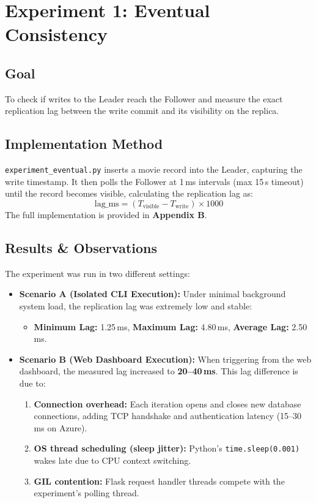 \documentclass[12pt]{article}
\begin{document}
\section{Experiment 1: Eventual Consistency}

\subsection{Goal}
To check if writes to the Leader reach the Follower and measure the exact replication lag between the write commit and its visibility on the replica.

\subsection{Implementation Method}
\texttt{experiment\_eventual.py} inserts a movie record into the Leader, capturing the write timestamp. It then polls the Follower at 1\,ms intervals (max 15\,s timeout) until the record becomes visible, calculating the replication lag as:
$$\text{lag\_ms} = (T_{\text{visible}} - T_{\text{write}}) \times 1000$$
The full implementation is provided in \textbf{Appendix B}.

\subsection{Results \& Observations}
The experiment was run in two different settings:
\begin{itemize}
    \item \textbf{Scenario A (Isolated CLI Execution):} Under minimal background system load, the replication lag was extremely low and stable:
    \begin{itemize}
        \item \textbf{Minimum Lag:} 1.25\,ms, \textbf{Maximum Lag:} 4.80\,ms, \textbf{Average Lag:} 2.50\,ms.
    \end{itemize}
    \item \textbf{Scenario B (Web Dashboard Execution):} When triggering from the web dashboard, the measured lag increased to \textbf{20--40\,ms}. This lag difference is due to:
    \begin{enumerate}
        \item \textbf{Connection overhead:} Each iteration opens and closes new database connections, adding TCP handshake and authentication latency (15--30\,ms on Azure).
        \item \textbf{OS thread scheduling (sleep jitter):} Python's \texttt{time.sleep(0.001)} wakes late due to CPU context switching.
        \item \textbf{GIL contention:} Flask request handler threads compete with the experiment's polling thread.
    \end{enumerate}
\end{itemize}
\end{document}
